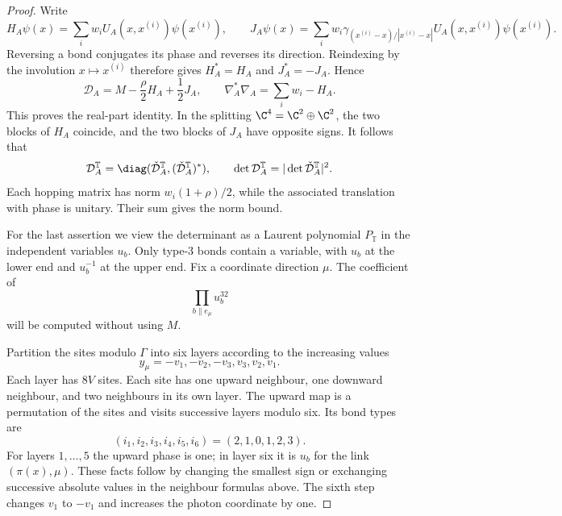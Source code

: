 \begin{proof}
Write
\[
 H_A\psi(x)=\sum_iw_iU_A(x,x^{(i)})\psi(x^{(i)}),\qquad
 J_A\psi(x)=\sum_iw_i\gamma_{(x^{(i)}-x)/|x^{(i)}-x|}
                         U_A(x,x^{(i)})\psi(x^{(i)}).
\]
Reversing a bond conjugates its phase and reverses its direction.
Reindexing by the involution $x\mapsto x^{(i)}$ therefore gives
$H_A^*=H_A$ and $J_A^*=-J_A$. Hence
\[
 \mathcal D_A=M-\frac\rho2H_A+\frac12J_A,\qquad
 \nabla_A^*\nabla_A=\sum_iw_i-H_A.
\]
This proves the real-part identity. In the splitting
$\C^4=\C^2\oplus\C^2$, the two blocks of $H_A$ coincide, and the two
blocks of $J_A$ have opposite signs. It follows that
\begin{equation}\label{eq:reg-two-blocks}
 \mathcal D_A^{\mathbb T}=\diag(\check{\mathcal D}_A^{\mathbb T},
                                      (\check{\mathcal D}_A^{\mathbb T})^*),
 \qquad \det \mathcal D_A^{\mathbb T}=|\det\check{\mathcal D}_A^{\mathbb T}|^2.
\end{equation}
Each hopping matrix has norm $w_i(1+\rho)/2$, while the associated
translation with phase is unitary. Their sum gives the norm bound.

For the last assertion we view the determinant as a Laurent
polynomial $P_{\mathbb T}$ in the independent variables $u_b$.
Only type-$3$ bonds contain a variable, with $u_b$ at the lower end
and $u_b^{-1}$ at the upper end. Fix a coordinate direction $\mu$.
The coefficient of
\begin{equation}\label{eq:reg-extreme-monomial}
 \prod_{b\parallel e_\mu}u_b^{32}
\end{equation}
will be computed without using $M$.

Partition the sites modulo $\Gamma$ into six layers according to
the increasing values
\[
 y_\mu=-v_1,-v_2,-v_3,v_3,v_2,v_1.
\]
Each layer has $8V$ sites. Each site has one upward neighbour,
one downward neighbour, and two neighbours in its own layer. The
upward map is a permutation of the sites and visits successive layers
modulo six. Its bond types are
\begin{equation}\label{eq:reg-upward-types}
 (i_1,i_2,i_3,i_4,i_5,i_6)=(2,1,0,1,2,3).
\end{equation}
For layers $1,\ldots,5$ the upward phase is one; in layer six it is
$u_b$ for the link $(\pi(x),\mu)$. These facts follow by changing the
smallest sign or exchanging successive absolute values in the
neighbour formulas above. The sixth step changes $v_1$ to $-v_1$
and increases the photon coordinate by one.


\end{proof}
